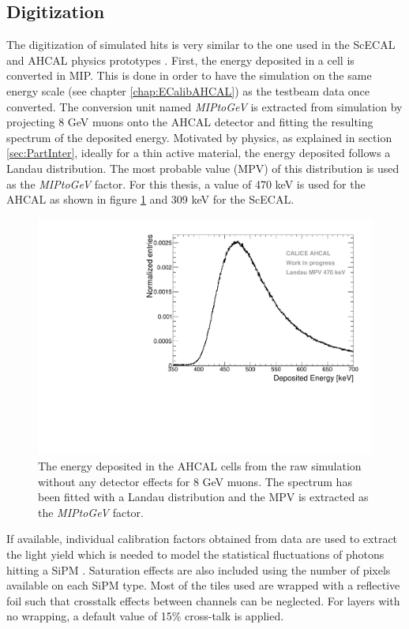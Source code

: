 \subsection{Digitization}
\label{subsec:Digitization}

The digitization of simulated hits is very similar to the one used in the ScECAL and AHCAL physics prototypes \cite{2011_JINST_6_P04003}. First, the energy deposited in a cell is converted in MIP. This is done in order to have the simulation on the same energy scale (see chapter \ref{chap:ECalibAHCAL}) as the testbeam data once converted. The conversion unit named \textit{MIPtoGeV} is extracted from simulation by projecting 8 GeV muons onto the AHCAL detector and fitting the resulting spectrum of the deposited energy. Motivated by physics, as explained in section \ref{sec:PartInter}, ideally for a thin active material, the energy deposited follows a Landau distribution. The most probable value (MPV) of this distribution is used as the \textit{MIPtoGeV} factor. For this thesis, a value of 470 keV is used for the AHCAL as shown in figure \ref{fig:landau_MPV} and 309 keV for the ScECAL.

\begin{figure}[htbp!]
  \centering
  \includegraphics[width=0.5\linewidth]{chap4/fig/Landau_mu_HCAL.pdf}
  \caption{The energy deposited in the AHCAL cells from the raw simulation without any detector effects for 8 GeV muons. The spectrum has been fitted with a Landau distribution and the MPV is extracted as the \textit{MIPtoGeV} factor.} \label{fig:landau_MPV}
\end{figure}

If available, individual calibration factors obtained from data are used to extract the light yield which is needed to model the statistical fluctuations of photons hitting a SiPM \cite{Hartbrich:2016bbz}. Saturation effects are also included using the number of pixels available on each SiPM type. Most of the tiles used are wrapped with a reflective foil such that crosstalk effects between channels can be neglected. For layers with no wrapping, a default value of 15\% cross-talk is applied.

